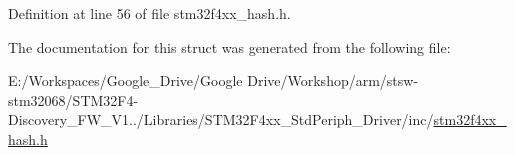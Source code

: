 Definition at line 56 of file stm32f4xx\-\_\-hash.\-h.



The documentation for this struct was generated from the following file\-:\begin{DoxyCompactItemize}
\item 
E\-:/\-Workspaces/\-Google\-\_\-\-Drive/\-Google Drive/\-Workshop/arm/stsw-\/stm32068/\-S\-T\-M32\-F4-\/\-Discovery\-\_\-\-F\-W\-\_\-\-V1../\-Libraries/\-S\-T\-M32\-F4xx\-\_\-\-Std\-Periph\-\_\-\-Driver/inc/\hyperlink{stm32f4xx__hash_8h}{stm32f4xx\-\_\-hash.\-h}\end{DoxyCompactItemize}
